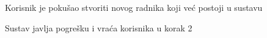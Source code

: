 \begin{packed_item}
\begin{packed_item}
\begin{packed_enum}
								\item 
								
							\end{packed_enum}
							
							\item[5. a] Korisnik je pokušao stvoriti novog radnika koji već postoji u sustavu
							
								\item[] \begin{packed_enum}
								
								\item Sustav javlja pogrešku i vraća korisnika u korak 2
								
							\end{packed_enum}

							
						\end{packed_item}
					\end{packed_item}

